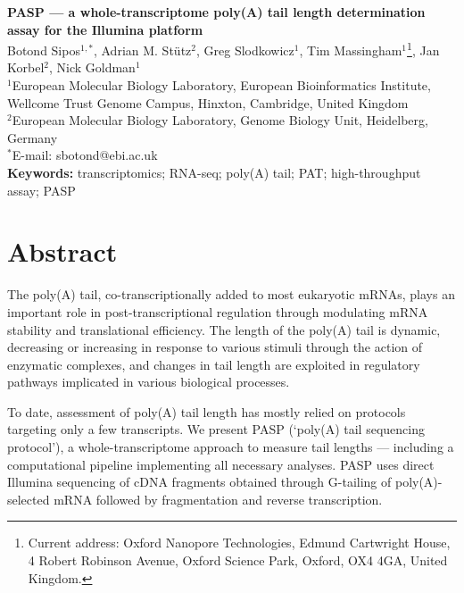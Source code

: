 \documentclass[10pt]{article}
\date{}
\begin{document}
\begin{flushleft}
{\Large
\textbf{PASP --- a whole-transcriptome poly(A) tail length determination assay for the Illumina platform}
}
\\
\vspace{5mm}
Botond Sipos$^{1, \ast}$, 
Adrian M. St\"utz$^{2}$, 
Greg Slodkowicz$^{1}$,
Tim Massingham$^{1}$\footnote{Current address: Oxford Nanopore Technologies, Edmund Cartwright House, 4 Robert Robinson Avenue, Oxford Science Park, Oxford, OX4 4GA, United Kingdom.},
Jan Korbel$^{2}$, 
Nick Goldman$^{1}$
\\
\vspace{5mm}
$^1$European Molecular Biology Laboratory, European Bioinformatics Institute, Wellcome Trust Genome Campus, Hinxton, Cambridge, United Kingdom
\\
$^2$European Molecular Biology Laboratory, Genome Biology Unit, Heidelberg, Germany 
\\
$^\ast$E-mail: sbotond@ebi.ac.uk
\\
\vspace{5mm}
\textbf{Keywords:} transcriptomics; RNA-seq; poly(A) tail; PAT; high-throughput assay; PASP

\end{flushleft}

\section*{Abstract}

The poly(A) tail, co-transcriptionally added to most eukaryotic mRNAs, plays an important role in post-transcriptional regulation through modulating mRNA stability and translational efficiency. The length of the poly(A) tail is dynamic, decreasing or increasing in response to various stimuli through the action of enzymatic complexes, and changes in tail length are exploited in regulatory pathways implicated in various biological processes.

To date, assessment of poly(A) tail length has mostly relied on protocols targeting only a few transcripts. We present PASP (`poly(A) tail sequencing protocol'), a whole-transcriptome approach to measure tail lengths  --- including a computational pipeline implementing all necessary analyses. PASP uses direct Illumina sequencing of cDNA fragments obtained through G-tailing of poly(A)-selected mRNA followed by fragmentation and reverse transcription. 
\end{document}
